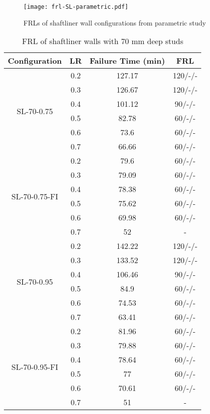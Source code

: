 \begin{figure}[!htbp]
	\centering
	\texttt{[image: frl-SL-parametric.pdf]}
	\caption{FRLs of shaftliner wall configurations from parametric study}
	\label{fig:frl-SL-parametric}
\end{figure}
\begin{table}[!htbp]
	\centering
	\caption{FRL of shaftliner walls with 70 mm deep studs}
	  \begin{tabular}{cccc}
	  \toprule
	  Configuration & LR    & Failure Time (min) & FRL \\
	  \midrule
	  \multirow{6}[2]{*}{SL-70-0.75} & 0.2   & 127.17 & 120/-/- \\
			& 0.3   & 126.67 & 120/-/- \\
			& 0.4   & 101.12 & 90/-/- \\
			& 0.5   & 82.78 & 60/-/- \\
			& 0.6   & 73.6  & 60/-/- \\
			& 0.7   & 66.66 & 60/-/- \\
	  \midrule
	  \multirow{6}[2]{*}{SL-70-0.75-FI} & 0.2   & 79.6  & 60/-/- \\
			& 0.3   & 79.09 & 60/-/- \\
			& 0.4   & 78.38 & 60/-/- \\
			& 0.5   & 75.62 & 60/-/- \\
			& 0.6   & 69.98 & 60/-/- \\
			& 0.7   & 52    & - \\
	  \midrule
	  \multirow{6}[2]{*}{SL-70-0.95} & 0.2   & 142.22 & 120/-/- \\
			& 0.3   & 133.52 & 120/-/- \\
			& 0.4   & 106.46 & 90/-/- \\
			& 0.5   & 84.9  & 60/-/- \\
			& 0.6   & 74.53 & 60/-/- \\
			& 0.7   & 63.41 & 60/-/- \\
	  \midrule
	  \multirow{6}[2]{*}{SL-70-0.95-FI} & 0.2   & 81.96 & 60/-/- \\
			& 0.3   & 79.88 & 60/-/- \\
			& 0.4   & 78.64 & 60/-/- \\
			& 0.5   & 77    & 60/-/- \\
			& 0.6   & 70.61 & 60/-/- \\
			& 0.7   & 51    & - \\
	  \bottomrule
	  \end{tabular}%
	\label{tab:frl-parametric-sl-70}%
  \end{table}%

